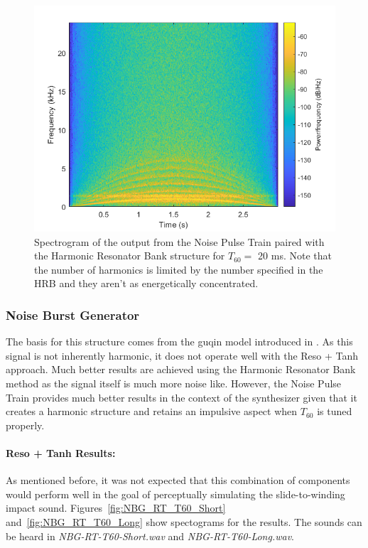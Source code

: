 \documentclass[../main.tex]{subfiles}
\begin{document}
\begin{figure}[h]
    \centering
    \includegraphics[scale=.65]{./images/plots/NPTHRBT60Long.png}
    \caption{Spectrogram of the output from the Noise Pulse Train paired with the Harmonic Resonator Bank structure for $T_{60} = $ 20 ms. Note that the number of harmonics is limited by the number specified in the HRB and they aren't as energetically concentrated.}
    \label{fig:NPT_HRB_T60_Long}
\end{figure}


\subsubsection{Noise Burst Generator}
The basis for this structure comes from the guqin model introduced in . As this signal is not inherently harmonic, it does not operate well with the Reso + Tanh approach. Much better results are achieved using the Harmonic Resonator Bank method as the signal itself is much more noise like. However, the Noise Pulse Train provides much better results in the context of the synthesizer given that it creates a harmonic structure and retains an impulsive aspect when $T_{60}$ is tuned properly.

\paragraph{Reso + Tanh Results:}
As mentioned before, it was not expected that this combination of components would perform well in the goal of perceptually simulating the slide-to-winding impact sound. Figures~\ref{fig:NBG_RT_T60_Short} and~\ref{fig:NBG_RT_T60_Long} show spectograms for the results. The sounds can be heard in \emph{NBG-RT-T60-Short.wav} and \emph{NBG-RT-T60-Long.wav}.
\end{document}
